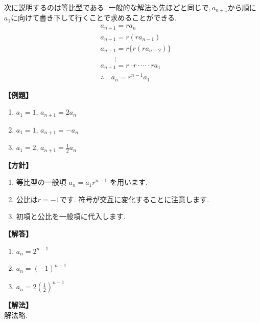 
次に説明するのは等比型である.
一般的な解法も先ほどと同じで,\,$a_{n+1}$から順に$a_1$に向けて書き下して行くことで求めることができる.
\begin{align*}
   & a_{n+1}=ra_n                             \\
   & a_{n+1}=r(ra_{n-1})                      \\
   & a_{n+1}=r\{r(ra_{n-2})\}                 \\
   & \qquad \vdots                            \\
   & a_{n+1}=r\cdot r \cdot \cdots \cdot ra_1 \\
   & \therefore \quad a_n=r^{n-1}a_1
\end{align*}

\noindent \textbf{【例題】}
\begin{enumerate}[label=(\arabic*),parsep=3pt]
  \item $\displaystyle a_1=1,\, a_{n+1}=2a_n$
  \item $\displaystyle a_1=1,\, a_{n+1}=-a_n$
  \item $\displaystyle a_1=2,\, a_{n+1}=\frac{1}{2}a_n$
\end{enumerate}

\noindent\textbf{【方針】}
\begin{enumerate}[label=(\arabic*),parsep=3pt]
  \item 等比型の一般項
        $\displaystyle a_n=a_1r^{n-1}$
        を用います.
  \item 公比は$r=-1$です.
        符号が交互に変化することに注意します.
  \item 初項と公比を一般項に代入します.
\end{enumerate}

\noindent\textbf{【解答】}
\begin{enumerate}[label=(\arabic*),parsep=3pt]
  \item $\displaystyle a_n=2^{n-1}$
  \item $\displaystyle a_n=(-1)^{n-1}$
  \item $\displaystyle a_n=2\left(\frac12\right)^{n-1}$
\end{enumerate}

\noindent\textbf{【解法】}\\
解法略.
